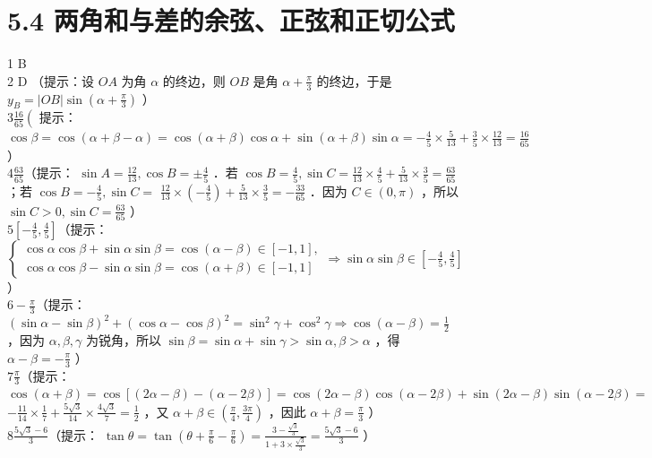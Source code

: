 \documentclass[10pt]{article}
\begin{document}
\section*{5.4 两角和与差的余弦、正弦和正切公式}
1 B\\
2 D （提示：设 \(O A\) 为角 \(\alpha\) 的终边，则 \(O B\) 是角 \(\alpha+\frac{\pi}{3}\) 的终边，于是 \(y_{B}=|O B| \sin \left(\alpha+\frac{\pi}{3}\right)\) ）\\
\(3 \frac{16}{65}\left(\right.\) 提示： \(\cos \beta=\cos (\alpha+\beta-\alpha)=\cos (\alpha+\beta) \cos \alpha+\sin (\alpha+\beta) \sin \alpha=-\frac{4}{5} \times \frac{5}{13}+\frac{3}{5} \times \frac{12}{13}=\frac{16}{65}\) ）\\
\(4 \frac{63}{65}\)（提示： \(\sin A=\frac{12}{13}, \cos B= \pm \frac{4}{5}\) ．若 \(\cos B=\frac{4}{5}, \sin C=\frac{12}{13} \times \frac{4}{5}+\frac{5}{13} \times \frac{3}{5}=\frac{63}{65}\) ；若 \(\cos B=-\frac{4}{5}, \sin C=\) \(\frac{12}{13} \times\left(-\frac{4}{5}\right)+\frac{5}{13} \times \frac{3}{5}=-\frac{33}{65}\) ．因为 \(C \in(0, \pi)\) ，所以 \(\sin C>0, \sin C=\frac{63}{65}\) ）\\
\(5\left[-\frac{4}{5}, \frac{4}{5}\right]\)（提示：\(\left\{\begin{array}{l}\cos \alpha \cos \beta+\sin \alpha \sin \beta=\cos (\alpha-\beta) \in[-1,1], \\ \cos \alpha \cos \beta-\sin \alpha \sin \beta=\cos (\alpha+\beta) \in[-1,1]\end{array} \Rightarrow \sin \alpha \sin \beta \in\left[-\frac{4}{5}, \frac{4}{5}\right]\right.\) ）\\
\(6-\frac{\pi}{3}\)（提示：\((\sin \alpha-\sin \beta)^{2}+(\cos \alpha-\cos \beta)^{2}=\sin ^{2} \gamma+\cos ^{2} \gamma \Rightarrow \cos (\alpha-\beta)=\frac{1}{2}\) ，因为 \(\alpha, \beta, \gamma\) 为锐角，所以 \(\sin \beta=\sin \alpha+\sin \gamma>\sin \alpha, \beta>\alpha\) ，得 \(\alpha-\beta=-\frac{\pi}{3}\) ）\\
\(7 \frac{\pi}{3}\)（提示： \(\cos (\alpha+\beta)=\cos [(2 \alpha-\beta)-(\alpha-2 \beta)]=\cos (2 \alpha-\beta) \cos (\alpha-2 \beta)+\sin (2 \alpha-\beta) \sin (\alpha-2 \beta)=\) \(-\frac{11}{14} \times \frac{1}{7}+\frac{5 \sqrt{3}}{14} \times \frac{4 \sqrt{3}}{7}=\frac{1}{2}\) ，又 \(\alpha+\beta \in\left(\frac{\pi}{4}, \frac{3 \pi}{4}\right)\) ，因此 \(\alpha+\beta=\frac{\pi}{3}\) ）\\
\(8 \frac{5 \sqrt{3}-6}{3}\)（提示： \(\tan \theta=\tan \left(\theta+\frac{\pi}{6}-\frac{\pi}{6}\right)=\frac{3-\frac{\sqrt{3}}{3}}{1+3 \times \frac{\sqrt{3}}{3}}=\frac{5 \sqrt{3}-6}{3}\) ）\\
\end{document}
